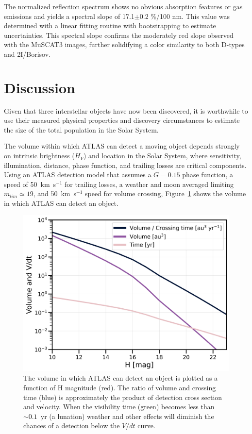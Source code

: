 \documentclass[linenumbers,twocolumn,longbib]{aastex7}
\begin{document}
The normalized reflection spectrum shows no obvious absorption features or gas emissions and yields a spectral slope of 17.1$\pm$0.2  \%/100 nm. This value was determined with a linear fitting routine with bootstrapping to estimate uncertainties. This spectral slope confirms the moderately red slope observed with the MuSCAT3 images, further solidifying a color similarity to both D-types and 2I/Borisov.

\section{Discussion}\label{sec:discussion}

Given that three interstellar objects have now been discovered, it is worthwhile to use their measured physical properties and discovery circumstances to estimate the size of the total population in the Solar System.

The volume within which ATLAS can detect a moving object depends strongly on intrinsic brightness ($H_V$) and location in the Solar System, where sensitivity, illumination, distance, phase function, and trailing losses are critical components. Using an ATLAS detection model that assumes a $G=0.15$ phase function, a speed of 50~km~s$^{-1}$ for trailing losses, a weather and moon averaged limiting $m_{lim}\simeq19$, and 50~km~s$^{-1}$ speed for volume crossing, Figure~\ref{fig:3I_rate} shows the volume in which ATLAS can detect an object.

\begin{figure}
\includegraphics[width=\linewidth]{figures/3I_xc_v2.png}
\caption{The volume in which ATLAS can detect an object is plotted as a function of H magnitude (red).  The ratio of volume and crossing time (blue) is approximately the product of detection cross section and velocity.  When the visibility time (green) becomes less than $\sim0.1$~yr (a lunation) weather and other effects will diminish the chances of a detection below the $V/dt$ curve.}
\label{fig:3I_rate}
\end{figure}
\end{document}
